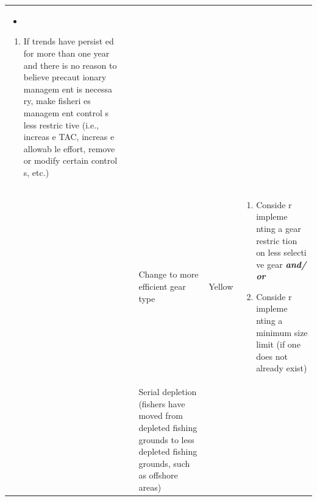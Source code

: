\documentclass[]{book}
\providecommand{\tightlist}{%
  \setlength{\itemsep}{0pt}\setlength{\parskip}{0pt}}
\begin{document}
\begin{longtable}[]{@{}lllll@{}}
\begin{minipage}[t]{0.19\columnwidth}
\begin{itemize}
\item
\end{itemize}

\begin{enumerate}
\def\labelenumi{\arabic{enumi}.}
\setcounter{enumi}{1}
\tightlist
\item
  If trends have persist ed for more than one year and there is no
  reason to believe precaut ionary managem ent is necessa ry, make
  fisheri es managem ent control s less restric tive (i.e., increas e
  TAC, increas e allowab le effort, remove or modify certain control s,
  etc.)
\end{enumerate}\strut
\end{minipage}\tabularnewline
\begin{minipage}[t]{0.19\columnwidth}\raggedright\strut
\strut
\end{minipage} & \begin{minipage}[t]{0.19\columnwidth}\raggedright\strut
\strut
\end{minipage} & \begin{minipage}[t]{0.19\columnwidth}\raggedright\strut
Change to more efficient gear type\strut
\end{minipage} & \begin{minipage}[t]{0.19\columnwidth}\raggedright\strut
Yellow\strut
\end{minipage} & \begin{minipage}[t]{0.19\columnwidth}\raggedright\strut
\begin{enumerate}
\def\labelenumi{\arabic{enumi}.}
\item
  Conside r impleme nting a gear restric tion on less selecti ve gear
  \textbf{\emph{and/ or}}
\item
  Conside r impleme nting a minimum size limit (if one does not already
  exist)
\end{enumerate}\strut
\end{minipage}\tabularnewline
\begin{minipage}[t]{0.19\columnwidth}\raggedright\strut
\strut
\end{minipage} & \begin{minipage}[t]{0.19\columnwidth}\raggedright\strut
\strut
\end{minipage} & \begin{minipage}[t]{0.19\columnwidth}\raggedright\strut
Serial depletion (fishers have moved from depleted fishing grounds to
less depleted fishing grounds, such as offshore areas)\strut
\end{minipage} & \begin{minipage}[t]{0.19\columnwidth}\raggedright\strut

\end{minipage}
\end{longtable}
\end{document}
